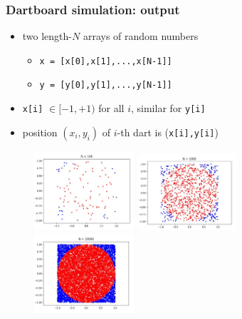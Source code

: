 \documentclass[english,14pt]{beamer}
\begin{document}

\begin{frame}[fragile]

\frametitle{Dartboard simulation: output}

\begin{itemize}
	\item two length-$N$ arrays of random numbers
	\begin{itemize}
		\item \texttt{x = [x[0],x[1],...,x[N-1]]}
		\item \texttt{y = [y[0],y[1],...,y[N-1]]}
	\end{itemize}
	\item \texttt{x[i]} $\in [-1,+1)$ for all $i$, similar for \texttt{y[i]}
	\item position $(x_i,y_i)$ of $i$-th dart is (\texttt{x[i],y[i]})
\end{itemize}

\begin{figure}[ht]
	\centering
	\includegraphics[width=0.33\textwidth]{figures/dartboard100}%
	\pause
	\includegraphics[width=0.33\textwidth]{figures/dartboard1000}%
	\pause
	\includegraphics[width=0.33\textwidth]{figures/dartboard10000}
\end{figure}

\end{frame}
\end{document}
